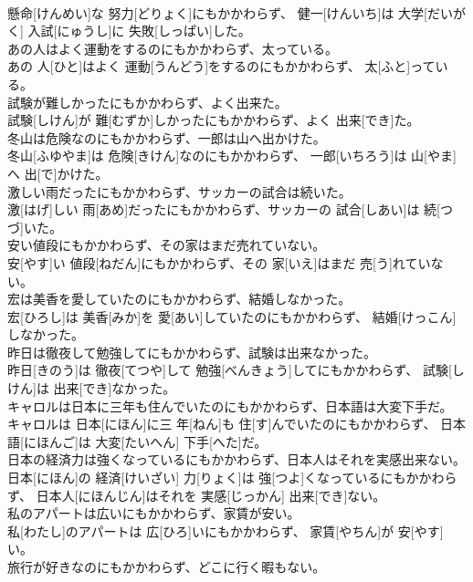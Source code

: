 \documentclass[8pt]{extreport}
\begin{document}
\begin{CJK}{UTF8}{min}
\\	懸命[けんめい]な 努力[どりょく]にもかかわらず、 健一[けんいち]は 大学[だいがく] 入試[にゅうし]に 失敗[しっぱい]した。
\\	あの人はよく運動をするのにもかかわらず、太っている。	
\\	あの 人[ひと]はよく 運動[うんどう]をするのにもかかわらず、 太[ふと]っている。
\\	試験が難しかったにもかかわらず、よく出来た。	
\\	試験[しけん]が 難[むずか]しかったにもかかわらず、よく 出来[でき]た。
\\	冬山は危険なのにもかかわらず、一郎は山へ出かけた。	
\\	冬山[ふゆやま]は 危険[きけん]なのにもかかわらず、 一郎[いちろう]は 山[やま]へ 出[で]かけた。
\\	激しい雨だったにもかかわらず、サッカーの試合は続いた。	
\\	激[はげ]しい 雨[あめ]だったにもかかわらず、サッカーの 試合[しあい]は 続[つづ]いた。
\\	安い値段にもかかわらず、その家はまだ売れていない。	
\\	安[やす]い 値段[ねだん]にもかかわらず、その 家[いえ]はまだ 売[う]れていない。
\\	宏は美香を愛していたのにもかかわらず、結婚しなかった。	
\\	宏[ひろし]は 美香[みか]を 愛[あい]していたのにもかかわらず、 結婚[けっこん]しなかった。
\\	昨日は徹夜して勉強してにもかかわらず、試験は出来なかった。	
\\	昨日[きのう]は 徹夜[てつや]して 勉強[べんきょう]してにもかかわらず、 試験[しけん]は 出来[でき]なかった。
\\	キャロルは日本に三年も住んでいたのにもかかわらず、日本語は大変下手だ。	
\\	キャロルは 日本[にほん]に三 年[ねん]も 住[す]んでいたのにもかかわらず、 日本語[にほんご]は 大変[たいへん] 下手[へた]だ。
\\	日本の経済力は強くなっているにもかかわらず、日本人はそれを実感出来ない。	
\\	日本[にほん]の 経済[けいざい] 力[りょく]は 強[つよ]くなっているにもかかわらず、 日本人[にほんじん]はそれを 実感[じっかん] 出来[でき]ない。
\\	私のアパートは広いにもかかわらず、家賃が安い。	
\\	私[わたし]のアパートは 広[ひろ]いにもかかわらず、 家賃[やちん]が 安[やす]い。
\\	旅行が好きなのにもかかわらず、どこに行く暇もない。	

\end{CJK}
\end{document}
